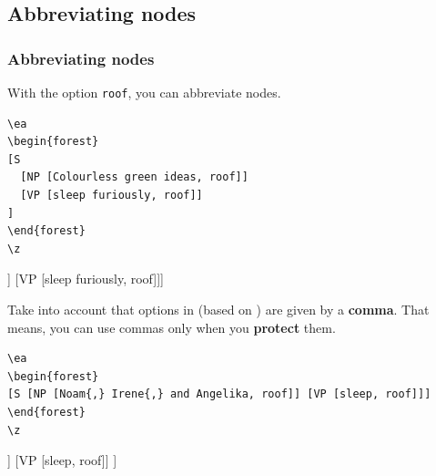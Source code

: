 \subsection{Abbreviating nodes}

\begin{frame}[fragile]
\frametitle{Abbreviating nodes}


With the option \lstinline|roof|, you can abbreviate nodes.

\begin{multicols}{2}
	
\begin{lstlisting}
\ea 
\begin{forest}
[S 
  [NP [Colourless green ideas, roof]] 
  [VP [sleep furiously, roof]]
]
\end{forest}
\z 
\end{lstlisting}

\ea %
{\scriptsize %
\begin{forest}
	[S [NP [Colourless green ideas, roof]] [VP [sleep furiously, roof]]]
\end{forest}
}
\z 

\end{multicols}

\pause 

Take into account that options in  (based on ) are given by a \textbf{comma}. That means, you can use commas only when you \textbf{protect} them.

\begin{multicols}{2}
	
\begin{lstlisting}
\ea 
\begin{forest}
[S [NP [Noam{,} Irene{,} and Angelika, roof]] [VP [sleep, roof]]]
\end{forest}
\z 
\end{lstlisting}
	
	
\ea %
{\scriptsize %
	\begin{forest}
		[S 
		[NP [Noam{,} Irene{,} and Angelika, roof]] 
		[VP [sleep, roof]]
		]
	\end{forest}
}
\z 
\end{multicols}

\end{frame}


